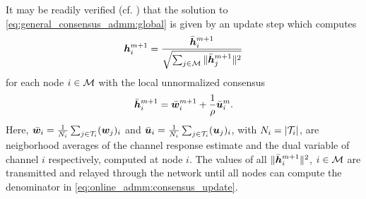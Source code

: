 \documentclass{article}
\begin{document}
It may be readily verified (cf. \cite{boydDistributedOptimizationStatistical2011}) that the solution to \eqref{eq:general_consensus_admm:global} is given by an update step which computes
\begin{equation}
    {\bm{h}}_i^{m+1} = \frac{\bar{{\bm{h}}}_i^{m+1}}{\sqrt{\sum_{j \in \mathcal{M}} \|\bar{{\bm{h}}}_j^{m+1}\|^2}}\label{eq:online_admm:consensus_update}
\end{equation}
for each node \(i \in \mathcal{M}\) with the local unnormalized consensus
\begin{equation}
    \bar{{\bm{h}}}_i^{m+1} = \bar{{\bm{w}}}_i^{m+1} + \frac{1}{\rho} \bar{{\bm{u}}}_i^{m}.
\end{equation}
Here, \(\bar{{\bm{w}}}_i = \frac{1}{N_i} \sum_{j \in \mathcal{T}_i} ({\bm{w}}_j)_i\) and \(\bar{{\bm{u}}}_i = \frac{1}{N_i} \sum_{j \in \mathcal{T}_i} ({\bm{u}}_j)_i\), with \(N_i = | \mathcal{T}_i |\), are neigborhood averages of the channel response estimate and the dual variable of channel \(i\) respectively, computed at node \(i\). The values of all \(\|\bar{{\bm{h}}}_i^{m+1}\|^2\), \(i \in \mathcal{M}\) are transmitted and relayed through the network until all nodes can compute the denominator in \eqref{eq:online_admm:consensus_update}.
\end{document}
